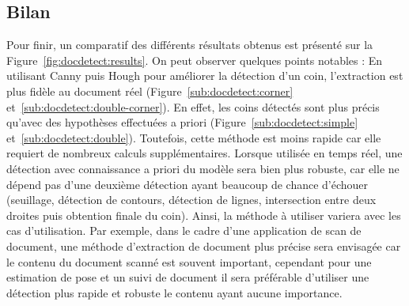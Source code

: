 \subsection{Bilan}
\label{subsec:doc:bilan}
Pour finir, un comparatif des différents résultats obtenus est présenté sur la Figure~\ref{fig:docdetect:results}.
On peut observer quelques points notables : En utilisant Canny puis Hough pour améliorer la détection d'un coin, l'extraction est plus fidèle au document réel (Figure~\ref{sub:docdetect:corner} et~\ref{sub:docdetect:double-corner}). En effet, les coins détectés sont plus précis qu'avec des hypothèses effectuées a priori (Figure~\ref{sub:docdetect:simple} et~\ref{sub:docdetect:double}). Toutefois, cette méthode est moins rapide car elle requiert de nombreux calculs supplémentaires. Lorsque utilisée en temps réel, une détection avec connaissance a priori du modèle sera bien plus robuste, car elle ne dépend pas d'une deuxième détection ayant beaucoup de chance d'échouer (seuillage, détection de contours, détection de lignes, intersection entre deux droites puis obtention finale du coin). Ainsi, la méthode à utiliser variera avec les cas d'utilisation. Par exemple, dans le cadre d'une application de scan de document, une méthode d'extraction de document plus précise sera envisagée car le contenu du document scanné est souvent important, cependant pour une estimation de pose et un suivi de document il sera préférable d'utiliser une détection plus rapide et robuste le contenu ayant aucune importance.

